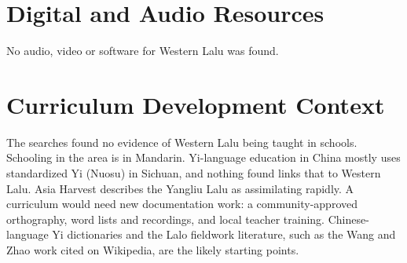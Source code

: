 \documentclass[12pt]{article}
\begin{document}
\section{Digital and Audio Resources}
No audio, video or software for Western Lalu was found.

\section{Curriculum Development Context}
The searches found no evidence of Western Lalu being taught in schools. Schooling in the area is in Mandarin. Yi-language education in China mostly uses standardized Yi (Nuosu) in Sichuan, and nothing found links that to Western Lalu. Asia Harvest describes the Yangliu Lalu as assimilating rapidly. A curriculum would need new documentation work: a community-approved orthography, word lists and recordings, and local teacher training. Chinese-language Yi dictionaries and the Lalo fieldwork literature, such as the Wang and Zhao work cited on Wikipedia, are the likely starting points.
\end{document}
